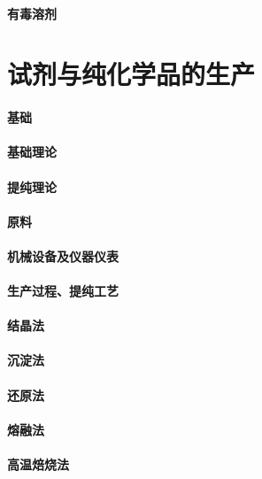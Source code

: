 \documentclass[UTF8]{../../ApplicationUniverse}
\begin{document}
\subsubsection{有毒溶剂}









 


\chapter{试剂与纯化学品的生产}
\subsubsection{基础}
    \subsubsection{基础理论}
        \subsubsection{提纯理论}
    \subsubsection{原料}
    \subsubsection{机械设备及仪器仪表}
    \subsubsection{生产过程、提纯工艺}
        \subsubsection{结晶法}
        \subsubsection{沉淀法}
        \subsubsection{还原法}
        \subsubsection{熔融法}
        \subsubsection{高温焙烧法}
\end{document}
